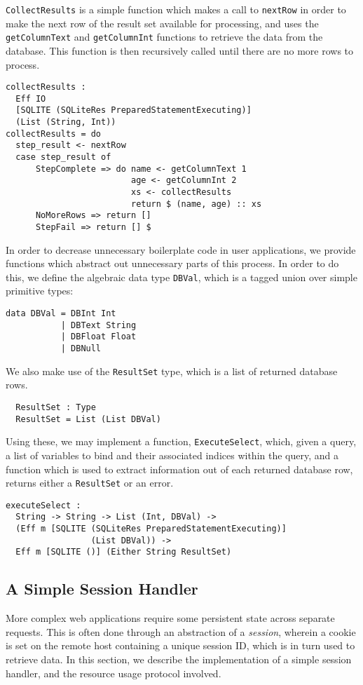 \documentclass[preprint]{sigplanconf}
\begin{document}
\texttt{CollectResults} is a simple function which makes a call to \texttt{nextRow} in order to make the next row of the result set available for processing, and uses the \texttt{getColumnText} and \texttt{getColumnInt} functions to retrieve the data from the database. This function is then recursively called until there are no more rows to process.
\begin{Verbatim}
collectResults : 
  Eff IO 
  [SQLITE (SQLiteRes PreparedStatementExecuting)] 
  (List (String, Int))
collectResults = do
  step_result <- nextRow
  case step_result of
      StepComplete => do name <- getColumnText 1
                         age <- getColumnInt 2
                         xs <- collectResults
                         return $ (name, age) :: xs
      NoMoreRows => return []
      StepFail => return [] $
\end{Verbatim}
In order to decrease unnecessary boilerplate code in user applications, we provide functions which abstract out unnecessary parts of this process. In order to do this, we define the algebraic data type \texttt{DBVal}, which is a tagged union over simple primitive types:
\begin{Verbatim}
data DBVal = DBInt Int
           | DBText String
           | DBFloat Float
           | DBNull
\end{Verbatim}
We also make use of the \texttt{ResultSet} type, which is a list of returned database rows.
\begin{Verbatim}
  ResultSet : Type
  ResultSet = List (List DBVal)
\end{Verbatim}
Using these, we may implement a function, \texttt{ExecuteSelect}, which, given a query, a list of variables to bind and their associated indices within the query, and a function which is used to extract information out of each returned database row, returns either a \texttt{ResultSet} or an error.
\begin{Verbatim}
executeSelect : 
  String -> String -> List (Int, DBVal) -> 
  (Eff m [SQLITE (SQLiteRes PreparedStatementExecuting)] 
                 (List DBVal)) -> 
  Eff m [SQLITE ()] (Either String ResultSet)
\end{Verbatim}
\subsection{A Simple Session Handler}
More complex web applications require some persistent state across separate requests. This is often done through an abstraction of a \textit{session}, wherein a cookie is set on the remote host containing a unique session ID, which is in turn used to retrieve data. In this section, we describe the implementation of a simple session handler, and the resource usage protocol involved. 
\end{document}
